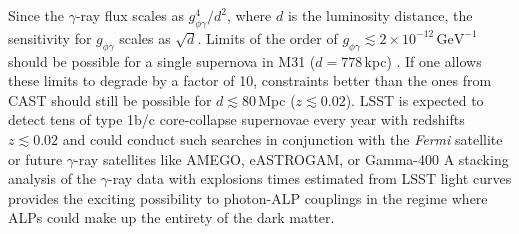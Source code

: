 Since the $\gamma$-ray flux scales as $g_{\phi\gamma}^4 / d^2$, where $d$ is the luminosity distance, the sensitivity for $g_{\phi\gamma}$ scales as $\sqrt{d}$. 
Limits of the order of $g_{\phi\gamma} \lesssim 2\times10^{-12}\,\mathrm{GeV}^{-1}$ should be possible for a single supernova in M31 ($d=778$\,kpc) \citep{2017PhRvL.118a1103M}. 
If one allows these limits to degrade by a factor of 10, constraints better than the ones from CAST should still be possible for $d\lesssim 80\,$Mpc ($z \lesssim 0.02$). 
LSST is expected to detect tens of type 1b/c core-collapse supernovae every year with redshifts $z \lesssim 0.02$ \citep{Goldstein:2018} and could conduct such searches in conjunction with the \textit{Fermi} satellite or future $\gamma$-ray satellites like AMEGO, eASTROGAM, or Gamma-400 \citep[\eg,][]{2017ICRC...35..910C,1502.02976} 
A stacking analysis of the $\gamma$-ray data with explosions times estimated from LSST light curves provides the exciting possibility to photon-ALP couplings in the regime where ALPs could make up the entirety of the dark matter. 





